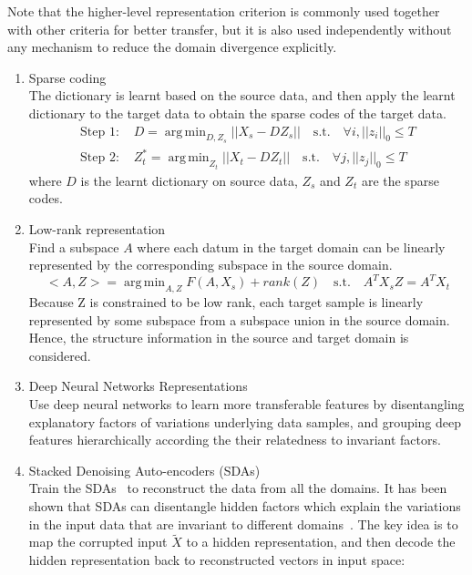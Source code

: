 \documentclass[prodmode]{acmsmall}  %
\DeclareMathOperator*{\argmin}{arg\,min}
\begin{document}
\begin{itemize}
Note that the higher-level representation criterion is commonly used together with other criteria for better transfer, but it is also used independently without any mechanism to reduce the domain divergence explicitly.
\begin{enumerate}
\item Sparse coding~\cite{Raina2007} \\
The dictionary is learnt based on the source data, and then apply the learnt dictionary to the target data to obtain the sparse codes of the target data.
\begin{align}
\text{Step 1: }& D = \argmin_{D,Z_s} ||X_{s}- DZ_s|| \quad
\text{s.t.} \quad \forall i, ||z_i||_0\leq{T} \\
\text{Step 2: } & Z^*_{t}=\argmin_{Z_{t}} ||X_{t}- DZ_t|| \quad
\text{s.t.} \quad \forall j, ||z_j||_0\leq{T} 
\end{align}
where $D$ is the learnt dictionary on source data, $Z_s$ and $Z_t$ are the sparse codes.
\item Low-rank representation~\cite{Shao2012}\\
Find a subspace $A$ where each datum in the target domain can be linearly represented by the corresponding subspace in the source domain.
\begin{equation}
<A,Z> = \argmin_{A,Z}F(A,X_s)+rank(Z) \quad
\text{s.t.} \quad A^TX_sZ = A^TX_t
\end{equation}
Because Z is constrained to be low rank, each target sample is linearly represented by some subspace from a subspace union in the source domain. Hence, the structure information in the source and target domain is considered.
\item Deep Neural Networks Representations~\cite{Donahue2014}\\
Use deep neural networks to learn more transferable features by disentangling explanatory factors of variations underlying data samples, and grouping deep features hierarchically according the their relatedness to invariant factors. 
\item Stacked Denoising Auto-encoders (SDAs)~\cite{Glorot2011,Chen2012}\\
Train the SDAs~\cite{Vincent2010} to reconstruct the data from all the domains. It has been shown that SDAs can disentangle hidden factors which explain the variations in the input data that are invariant to different domains~\cite{Glorot2011,Chen2012}. The key idea is to map the corrupted input $\tilde{X}$ to a hidden representation, and then decode the hidden representation back to reconstructed vectors in input space:

\end{enumerate}
\end{itemize}
\end{document}
